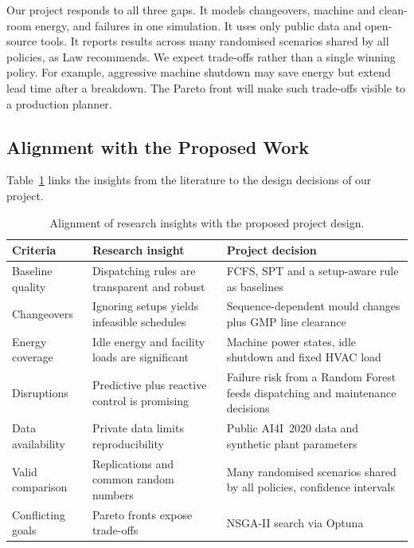 \documentclass[11pt,a4paper]{article}
\begin{document}
Our project responds to all three gaps. It models changeovers, machine and clean-room energy, and failures in one simulation. It uses only public data and open-source tools. It reports results across many randomised scenarios shared by all policies, as Law \cite{law2015} recommends. We expect trade-offs rather than a single winning policy. For example, aggressive machine shutdown may save energy but extend lead time after a breakdown. The Pareto front will make such trade-offs visible to a production planner.

\subsection{Alignment with the Proposed Work}
Table~\ref{tab:align} links the insights from the literature to the design decisions of our project.

\begin{table}[H]
\centering
\small
\begin{tabularx}{\textwidth}{>{\raggedright}p{3cm}>{\raggedright}X>{\raggedright\arraybackslash}X}
\toprule
\textbf{Criteria} & \textbf{Research insight} & \textbf{Project decision} \\
\midrule
Baseline quality & Dispatching rules are transparent and robust \cite{pinedo2016,ouelhadj2009} & FCFS, SPT and a setup-aware rule as baselines \\
Changeovers & Ignoring setups yields infeasible schedules \cite{allahverdi2008} & Sequence-dependent mould changes plus GMP line clearance \\
Energy coverage & Idle energy and facility loads are significant \cite{mouzon2007,gahm2016} & Machine power states, idle shutdown and fixed HVAC load \\
Disruptions & Predictive plus reactive control is promising \cite{ouelhadj2009,duan2021} & Failure risk from a Random Forest feeds dispatching and maintenance decisions \\
Data availability & Private data limits reproducibility \cite{carvalho2019,matzka2020} & Public AI4I~2020 data and synthetic plant parameters \\
Valid comparison & Replications and common random numbers \cite{law2015} & Many randomised scenarios shared by all policies, confidence intervals \\
Conflicting goals & Pareto fronts expose trade-offs \cite{deb2002} & NSGA-II search via Optuna \cite{akiba2019} \\
\bottomrule
\end{tabularx}
\caption{Alignment of research insights with the proposed project design.}
\label{tab:align}
\end{table}
\end{document}
